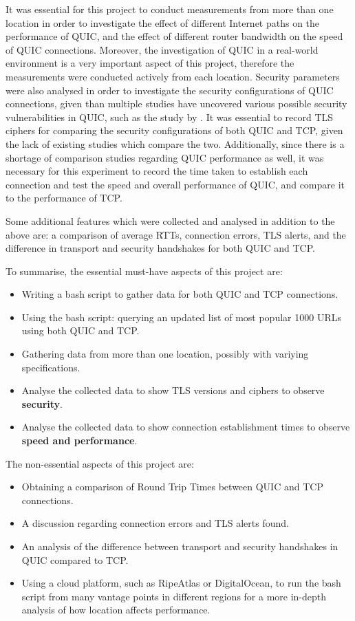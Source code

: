 \documentclass{l4proj}
\begin{document}
It was essential for this project to conduct measurements from more than one location in order to investigate the effect of different Internet paths on the performance of QUIC, and the effect of different router bandwidth on the speed of QUIC connections. Moreover, the investigation of QUIC in a real-world environment is a very important aspect of this project, therefore the measurements were conducted actively from each location. Security parameters were also analysed in order to investigate the security configurations of QUIC connections, given than multiple studies have uncovered various possible security vulnerabilities in QUIC, such as the study by \citet{Soni2021}. It was essential to record TLS ciphers for comparing the security configurations of both QUIC and TCP, given the lack of existing studies which compare the two. Additionally, since there is a shortage of comparison studies regarding QUIC performance as well, it was necessary for this experiment to record the time taken to establish each connection and test the speed and overall performance of QUIC, and compare it to the performance of TCP. 

Some additional features which were collected and analysed in addition to the above are: a comparison of average RTTs, connection errors, TLS alerts, and the difference in transport and security handshakes for both QUIC and TCP. 

To summarise, the essential must-have aspects of this project are:

\begin{itemize}
    \item {Writing a bash script to gather data for both QUIC and TCP connections.}
    \item {Using the bash script: querying an updated list of most popular 1000 URLs using both QUIC and TCP.}
    \item {Gathering data from more than one location, possibly with variying specifications.}
    \item {Analyse the collected data to show TLS versions and ciphers to observe \textbf{security}.}
    \item {Analyse the collected data to show connection establishment times to observe \textbf{speed and performance}.}
\end{itemize}

The non-essential aspects of this project are:
\begin{itemize}
    \item {Obtaining a comparison of Round Trip Times between QUIC and TCP connections.}
    \item {A discussion regarding connection errors and TLS alerts found.}
    \item {An analysis of the difference between transport and security handshakes in QUIC compared to TCP.}
    \item {Using a cloud platform, such as RipeAtlas or DigitalOcean, to run the bash script from many vantage points in different regions for a more in-depth analysis of how location affects performance.}
\end{itemize}
\end{document}
